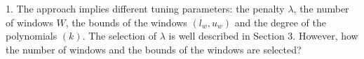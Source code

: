 \documentclass{article}
\begin{document}

1. The approach implies different tuning parameters: the penalty $\lambda$, the number of windows $W$, the bounds of the windows $(l_w, u_w)$ and the degree of the polynomials $(k)$. The selection of $\lambda$ is well described in Section 3. However, how the number of windows and the bounds of the windows are selected? 
\end{document}
